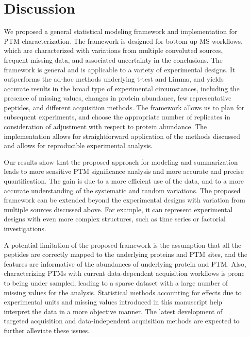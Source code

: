 \documentclass[mcp]{article}
\numberwithin{figure}{section} %
\numberwithin{table}{section}
\begin{document}
\section{Discussion}

We proposed a general statistical modeling framework and implementation for PTM characterization. The framework is designed for bottom-up MS workflows, which are characterized with variations from multiple convoluted sources, frequent missing data, and associated uncertainty in the conclusions. The framework is general and is applicable to a variety of experimental designs. It outperforms the ad-hoc methods underlying t-test and Limma, and yields accurate results in the broad type of experimental circumstances, including the presence of missing values, changes in protein abundance, few representative peptides, and different acquisition methods. The framework allows us to plan for subsequent experiments, and choose the appropriate number of replicates in consideration of adjustment with respect to protein abundance. The implementation allows for straightforward application of the methods discussed and allows for reproducible experimental analysis.

Our results show that the proposed approach for modeling and summarization  leads to more sensitive PTM significance analysis and more accurate and precise quantification. The gain is due to a more efficient use of the data, and to a more accurate understanding of the systematic and random variations. The proposed framework can be extended beyond the experimental designs with variation from multiple sources discussed above. For example, it can represent experimental designs with even more complex structures, such as time series or factorial investigations. 

A potential limitation of the proposed framework is the assumption that all the peptides are correctly mapped to the underlying proteins and PTM sites, and the features are informative of the abundances of underlying protein and PTM. Also, characterizing PTMs with current data-dependent acquisition workflows is prone to being under sampled, leading to a sparse dataset with a large number of missing values for the analysis. Statistical methods accounting for effects due to experimental units and missing values introduced in this manuscript help interpret the data in a more objective manner. The latest development of targeted acquisition and data-independent acquisition methods are expected to further alleviate these issues. 
\end{document}
